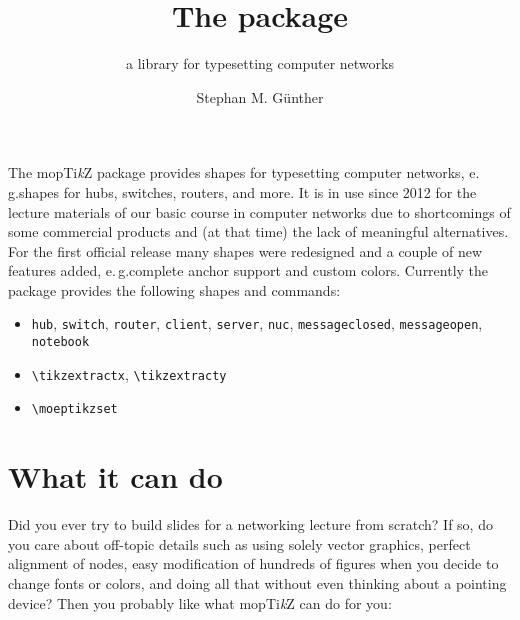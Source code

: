 \documentclass{scrartcl}
\title{The \moeptikz{} package}
\subtitle{a library for typesetting computer networks}
\author{Stephan M. G\"unther}
\newcommand*{\TikZ}{Ti\textit{k}Z\xspace}
\newcommand*{\moeptikz}{mo\reflectbox{e}p\TikZ}
\begin{document}
\maketitle

The \moeptikz{} package provides shapes for typesetting computer networks,
e.\,g.\@ shapes for hubs, switches, routers, and more.
It is in use since 2012 for the lecture materials of our basic course in
computer networks due to shortcomings of some commercial products and
(at that time) the lack of meaningful alternatives.
For the first official release many shapes were redesigned and a couple of new
features added, e.\,g.\@ complete anchor support and custom colors.
Currently the package provides the following shapes and commands:
\begin{itemize}\itemsep0pt
	\item \verb|hub|, \verb|switch|, \verb|router|, \verb|client|,
	\verb|server|, \verb|nuc|, \verb|messageclosed|, \verb|messageopen|,
	\verb|notebook|
	\item \verb|\tikzextractx|, \verb|\tikzextracty|
	\item \verb|\moeptikzset|{}
\end{itemize}

\section{What it can do}
Did you ever try to build slides for a networking lecture from scratch?
If so, do you care about off-topic details such as using solely vector
graphics, perfect alignment of nodes, easy modification of hundreds of figures
when you decide to change fonts or colors, and doing all that without even
thinking about a pointing device?
Then you probably like what \moeptikz{} can do for you:
\end{document}
